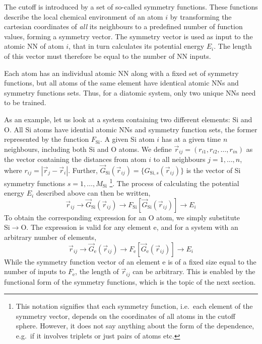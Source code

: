 \documentclass[twoside,english]{uiofysmaster}
\begin{document}
The cutoff is introduced by a set of so-called symmetry functions. 
These functions
describe the local chemical environment of an atom $i$ by transforming the cartesian coordinates of \textit{all} its neighbours to 
a predefined number of function values, forming a symmetry vector. 
The symmetry vector is used as input to the atomic NN of atom $i$, that in turn calculates its potential energy $E_i$.
The length of this vector must therefore be equal to the number of NN inputs. 

Each atom has an individual atomic NN along with a fixed set of symmetry functions, but
all atoms of the same element have identical 
atomic NNs and symmetry functions sets. Thus, for a diatomic system, only two unique NNs need to be trained. 

As an example, let us look at a system containing two different elements: Si and O. 
All Si atoms have idential atomic NNs and symmetry function sets, the former represented by the function $F_{\mathrm{Si}}$. 
A given Si atom $i$ has at a given time $n$ neighbours, including both Si and O atoms.  
We define $\vec{r}_{ij} = (r_{i1}, r_{i2}, \dots, r_{in})$ as the vector containing the distances from
atom $i$ to all neighbours $j = 1,\dots,n$, where $r_{ij} = |\vec{r}_j - \vec{r}_i|$. 
Further, $\vec{G}_\mathrm{Si}(\vec{r}_{ij}) = \{G_{\mathrm{Si},s}(\vec{r}_{ij})\}$ is the vector of Si symmetry functions
$s = 1,\dots,M_\mathrm{Si}$%
\footnote{This notation signifies that each symmetry function, i.e.\ each element of 
the symmetry vector, depends on the coordinates of all atoms in the cutoff sphere. However, it does not say anything about
the form of the dependence, e.g.\ if it involves triplets or just pairs of atoms etc.}.
The process of calculating the potential energy $E_i$ described above can then be written,
\begin{equation}
 \vec{r}_{ij} \rightarrow \vec{G}_\mathrm{Si}(\vec{r}_{ij}) \rightarrow F_\mathrm{Si}[\vec{G}_\mathrm{Si}(\vec{r}_{ij})] 
 \rightarrow E_i
 \label{BPatomicEnergySi}
\end{equation}
To obtain the corresponding expression for an O atom, we simply substitute $\mathrm{Si} \rightarrow \mathrm{O}$. 
The expression is valid for any element e, and for a system with an arbitrary number of elements,
\begin{equation}
  \vec{r}_{ij} \rightarrow \vec{G}_\mathrm{e}(\vec{r}_{ij}) \rightarrow F_\mathrm{e}[\vec{G}_\mathrm{e}(\vec{r}_{ij})] 
 \rightarrow E_i
 \label{BPatomicEnergy}
\end{equation}
While the symmetry function vector of an element e is of a fixed size equal to the number of inputs to $F_\mathrm{e}$,
the length of $\vec{r}_{ij}$ can be arbitrary. This is enabled by the functional form of the symmetry functions, 
which is the topic of the next section. 
\end{document}
